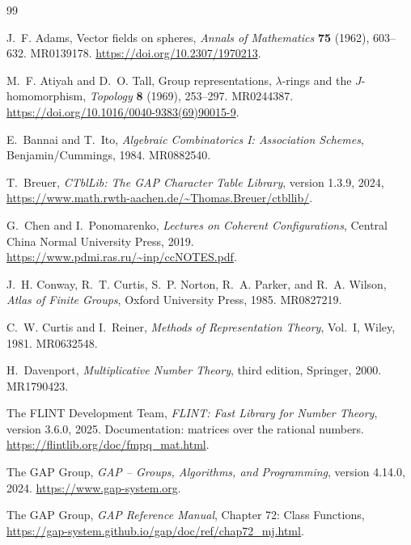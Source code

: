 \documentclass[11pt,reqno]{amsart}
\numberwithin{equation}{section}
\theoremstyle{remark}
\theoremstyle{plain}
\newcommand{\1}{\mathbf 1}
\begin{document}
\appendix


\begin{thebibliography}{99}

J.~F. Adams,
\newblock Vector fields on spheres,
\newblock \emph{Annals of Mathematics} \textbf{75} (1962), 603--632.
\newblock MR0139178.
\newblock \url{https://doi.org/10.2307/1970213}.

M.~F. Atiyah and D.~O. Tall,
\newblock Group representations, \(\lambda\)-rings and the \(J\)-homomorphism,
\newblock \emph{Topology} \textbf{8} (1969), 253--297.
\newblock MR0244387.
\newblock \url{https://doi.org/10.1016/0040-9383(69)90015-9}.

E.~Bannai and T.~Ito,
\newblock \emph{Algebraic Combinatorics I: Association Schemes},
\newblock Benjamin/Cummings, 1984.
\newblock MR0882540.

T.~Breuer,
\newblock \emph{CTblLib: The GAP Character Table Library},
\newblock version 1.3.9, 2024,
\newblock \url{https://www.math.rwth-aachen.de/~Thomas.Breuer/ctbllib/}.


G.~Chen and I.~Ponomarenko,
\newblock \emph{Lectures on Coherent Configurations},
\newblock Central China Normal University Press, 2019.
\newblock \url{https://www.pdmi.ras.ru/~inp/ccNOTES.pdf}.

J.~H. Conway, R.~T. Curtis, S.~P. Norton, R.~A. Parker, and R.~A. Wilson,
\newblock \emph{Atlas of Finite Groups},
\newblock Oxford University Press, 1985.
\newblock MR0827219.

C.~W. Curtis and I.~Reiner,
\newblock \emph{Methods of Representation Theory}, Vol.~I,
\newblock Wiley, 1981.
\newblock MR0632548.

H.~Davenport,
\newblock \emph{Multiplicative Number Theory},
\newblock third edition, Springer, 2000.
\newblock MR1790423.

The FLINT Development Team,
\newblock \emph{FLINT: Fast Library for Number Theory}, version 3.6.0, 2025.
\newblock Documentation: matrices over the rational numbers.
\newblock \url{https://flintlib.org/doc/fmpq_mat.html}.

The GAP Group,
\newblock \emph{GAP -- Groups, Algorithms, and Programming},
\newblock version 4.14.0, 2024.
\newblock \url{https://www.gap-system.org}.

The GAP Group,
\newblock \emph{GAP Reference Manual}, Chapter 72: Class Functions,
\newblock \url{https://gap-system.github.io/gap/doc/ref/chap72_mj.html}.


\end{thebibliography}
\end{document}
